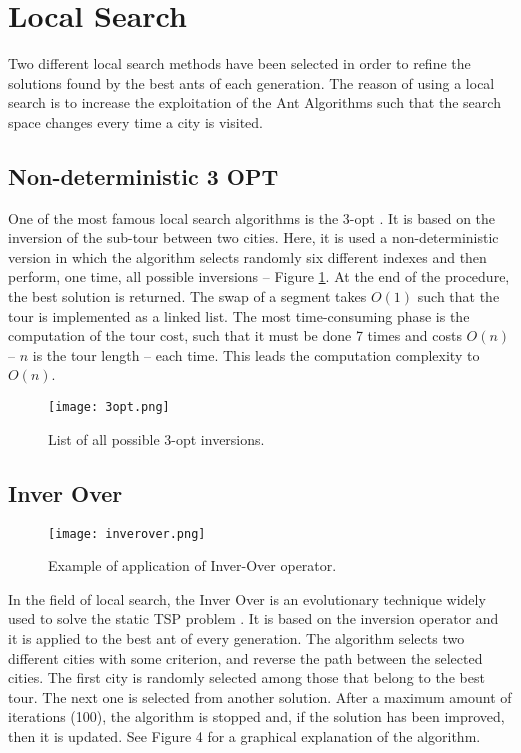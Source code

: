 \documentclass[a4paper,9pt,journal,twoside,compsoc]{PPIEEEtran}
\begin{document}

\section{Local Search}
Two different local search methods have been selected in order to refine the solutions found by the best ants of each generation. The reason of using a local search is to increase the exploitation of the Ant Algorithms such that the search space changes every time a city is visited. 


\subsection{Non-deterministic 3 OPT}
One of the most famous local search algorithms is the 3-opt \cite{opt3}. It is based on the inversion of the sub-tour between two cities. Here, it is used a non-deterministic version in which the algorithm selects randomly six different indexes and then perform, one time, all possible inversions -- Figure \ref{fig:3optinverisions}. At the end of the procedure, the best solution is returned. The swap of a segment takes $O(1)$ such that the tour is implemented as a linked list. The most time-consuming phase is the computation of the tour cost, such that it must be done 7 times and costs $O(n)$ -- $n$ is the tour length -- each time. This leads the computation complexity to $ O( n ) $.

\begin{figure}[!h]
\centering
\captionsetup{justification=centering}
\texttt{[image: 3opt.png]}
\caption{List of all possible 3-opt inversions.}
\label{fig:3optinverisions}
\end{figure}



\subsection{Inver Over}
\begin{figure}[h]
\centering%
\texttt{[image: inverover.png]}
\caption{Example of application of Inver-Over operator.}
\label{fig:inverover}
\end{figure}
In the field of local search, the Inver Over \cite{inverover} is an evolutionary technique widely used to solve the static TSP problem \cite{inverover_mica}. It is based on the inversion operator and it is applied to the best ant of every generation. The algorithm selects two different cities with some criterion, and reverse the path between the selected cities. The first city is randomly selected among those that belong to the best tour. The next one is selected from another solution. After a maximum amount of iterations (100), the algorithm is stopped and, if the solution has been improved, then it is updated. See Figure 4 for a graphical explanation of the algorithm.
\end{document}
